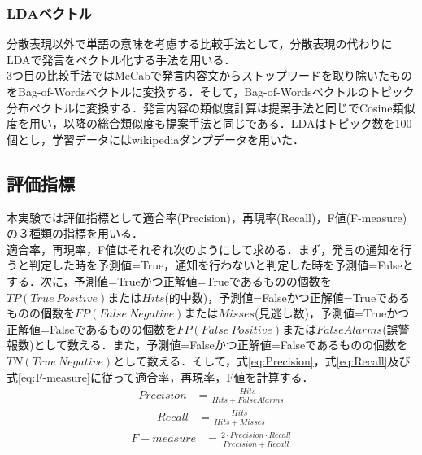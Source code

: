 \subsubsection*{ LDAベクトル}
分散表現以外で単語の意味を考慮する比較手法として，分散表現の代わりにLDAで発言をベクトル化する手法を用いる．\\
3つ目の比較手法ではMeCabで発言内容文からストップワードを取り除いたものをBag-of-Wordsベクトルに変換する．そして，Bag-of-Wordsベクトルのトピック分布ベクトルに変換する．発言内容の類似度計算は提案手法と同じでCosine類似度を用い，以降の総合類似度も提案手法と同じである．LDAはトピック数を100個とし，学習データにはwikipediaダンプデータを用いた．

\subsection{評価指標}
本実験では評価指標として適合率(Precision)，再現率(Recall)，F値(F-measure)の３種類の指標を用いる．\\
適合率，再現率，F値はそれぞれ次のようにして求める．まず，発言の通知を行うと判定した時を予測値=True，通知を行わないと判定した時を予測値=Falseとする．次に，予測値=Trueかつ正解値=Trueであるものの個数を$TP(True~Positive)$または$Hits$(的中数)，予測値=Falseかつ正解値=Trueであるものの個数を$FP(False~Negative)$または$Misses$(見逃し数)，予測値=Trueかつ正解値=Falseであるものの個数を$FP(False~Positive)$または$FalseAlarms$(誤警報数)として数える．また，予測値=Falseかつ正解値=Falseであるものの個数を$TN(True~Negative)$として数える．そして，式\ref{eq:Precision}，式\ref{eq:Recall}及び式\ref{eq:F-measure}に従って適合率，再現率，F値を計算する．
\begin{equation}
\begin{aligned}
\label{eq:Precision}
Precision & = \frac{Hits}{Hits+FalseAlarms}
\end{aligned}
\end{equation}
%
\begin{equation}
\begin{aligned}
\label{eq:Recall}
Recall & = \frac{Hits}{Hits+Misses}
\end{aligned}
\end{equation}
%
\begin{equation}
\begin{aligned}
\label{eq:F-measure}
F-measure & = \frac{2 \cdot Precision \cdot Recall}{Precision+Recall}
\end{aligned}
\end{equation}

